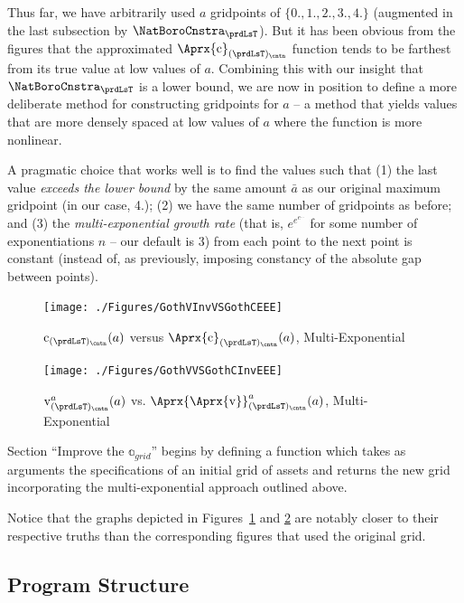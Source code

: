 \documentclass[titlepage, headings=optiontotocandhead]{econtex}
\begin{document}
Thus far, we have arbitrarily used $a$ gridpoints of $\{0.,1.,2.,3.,4.\}$ (augmented in the last subsection by $\NatBoroCnstra_{\prdLsT}$).  But it has been obvious from the figures that the approximated $\Aprx{\mathrm{c}}_{(\prdLsT)_\cntn}$ function tends to be farthest from its true value at low values of $a$.  Combining this with our insight that $\NatBoroCnstra_{\prdLsT}$ is a lower bound, we are now in position to define a more deliberate method for constructing gridpoints for $a$ -- a method that yields values that are more densely spaced at low values of $a$ where the function is more nonlinear.

A pragmatic choice that works well is to find the values such that (1) the last value \textit{exceeds the lower bound} by the same amount $\bar a$ as our original maximum gridpoint (in our case, 4.); (2) we have the same number of gridpoints as before; and (3) the \textit{multi-exponential growth rate} (that is, $e^{e^{e^{...}}}$ for some number of exponentiations $n$ -- our default is 3) from each point to the next point is constant (instead of, as previously, imposing constancy of the absolute gap between points).

\hypertarget{GothVInvVSGothCEEE}{}
\begin{figure}
  \centerline{\texttt{[image: ./Figures/GothVInvVSGothCEEE]}}
  \caption{$\mathrm{c}_{(\prdLsT)_\cntn}(a)$ versus
    $\Aprx{\mathrm{c}}_{(\prdLsT)_\cntn}(a)$, Multi-Exponential }
  \label{fig:GothVInvVSGothCEE}
\end{figure}


\hypertarget{GothVVSGothCInvEEE}{}
\begin{figure}
  \texttt{[image: ./Figures/GothVVSGothCInvEEE]}
  \caption{$\mathrm{v}^{a}_{(\prdLsT)_\cntn}(a)$ vs.
    $\Aprx{\Aprx{\mathrm{v}}}_{(\prdLsT)_\cntn}^{a}(a)$, Multi-Exponential }
  \label{fig:GothVVSGothCInvEE}
\end{figure}

Section ``Improve the $\mathbb{a}_{grid}$'' begins by defining a function which takes as arguments the specifications of an initial grid of assets and returns the new grid incorporating the multi-exponential approach outlined above.


Notice that the graphs depicted in Figures~\ref{fig:GothVInvVSGothCEE} and \ref{fig:GothVVSGothCInvEE} are notably closer to their respective truths than the corresponding figures that used the original grid.

\subsection{Program Structure}
\end{document}

